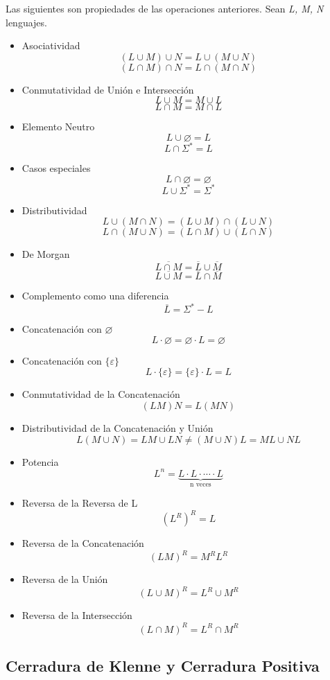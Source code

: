 Las siguientes son propiedades de las operaciones anteriores. Sean \textit{L, M, N} lenguajes.
\begin{itemize}
  \item Asociatividad 
    \[(L \cup M) \cup N = L \cup (M \cup N)\] 
    \[(L \cap M) \cap N = L \cap (M \cap N)\]
  \item Conmutatividad de Unión e Intersección
    \[L \cup M = M \cup L\]
    \[L \cap M = M \cap L\]
  \item Elemento Neutro
    \[L \cup \varnothing = L\]
    \[L \cap \Sigma^* = L\]
  \item Casos especiales
    \[L \cap \varnothing = \varnothing\]
    \[L \cup \Sigma^* = \Sigma^*\]
  \item Distributividad
    \[L \cup(M \cap N) = (L \cup M) \cap (L \cup N)\]
    \[L \cap(M \cup N) = (L \cap M) \cup (L \cap N)\]
  \item De Morgan
    \[\overline{L \cap M} = \overline L \cup \overline M\]
    \[\overline{L \cup M} = \overline L \cap \overline M\]
  \item Complemento como una diferencia
    \[\overline L = \Sigma^* - L\]
  \item Concatenación con $\varnothing$
    \[L \cdot \varnothing = \varnothing \cdot L = \varnothing\]
  \item Concatenación con $\{\varepsilon\}$
    \[L \cdot \{\varepsilon\} = \{\varepsilon\} \cdot L = L\]
  \item Conmutatividad de la Concatenación
    \[(LM) N = L(MN)\]
  \item Distributividad de la Concatenación y Unión
    \[L(M \cup N) = LM \cup LN \neq (M \cup N) L = ML \cup NL\]
  \item Potencia
    \[L^n = \underbrace{L \cdot L \cdot \cdots \cdot L}_{\text{n veces}}\]
  \item Reversa de la Reversa de L
    \[(L^R)^R = L\]
  \item Reversa de la Concatenación
    \[(LM)^R = M^R L^R\]
  \item Reversa de la Unión
    \[(L \cup M)^R = L^R \cup M^R\]
  \item Reversa de la Intersección
    \[(L \cap M)^R = L^R \cap M^R\]
\end{itemize}

\subsection{Cerradura de Klenne y Cerradura Positiva}

